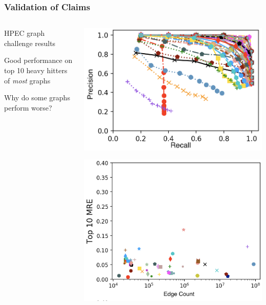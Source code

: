 \documentclass{beamer}
\begin{document}
\begin{frame}
\frametitle{Validation of Claims}

\begin{columns}
	\begin{column}{0.2\textwidth}
		\begin{block}{}
			HPEC graph challenge results
		\end{block}
		\begin{block}{}
			Good performance  on top 10 heavy hitters of \emph{most} graphs
		\end{block}
		\begin{block}{}
			Why do some graphs perform worse?
		\end{block}
	\end{column}
	\begin{column}{0.4\textwidth}
		\centerline{\includegraphics[width=1.0\columnwidth]{precision_vs_recall_top_10}}
		\centerline{\includegraphics[width=1.0\columnwidth]{errs_vs_E_top_10}}

\end{column}
\end{columns}
\end{frame}
\end{document}

